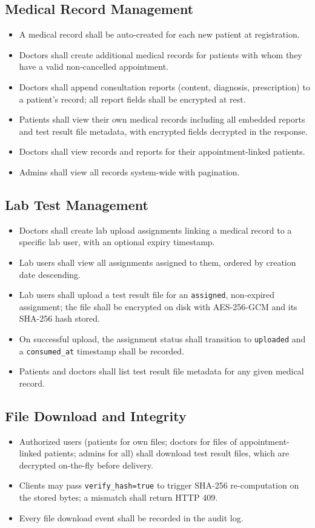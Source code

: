 \documentclass[a4paper,12pt]{report}
\begin{document}
\subsection{Medical Record Management}
\begin{itemize}
    \item A medical record shall be auto-created for each new patient at registration.
    \item Doctors shall create additional medical records for patients with whom they have a valid non-cancelled appointment.
    \item Doctors shall append consultation reports (content, diagnosis, prescription) to a patient's record; all report fields shall be encrypted at rest.
    \item Patients shall view their own medical records including all embedded reports and test result file metadata, with encrypted fields decrypted in the response.
    \item Doctors shall view records and reports for their appointment-linked patients.
    \item Admins shall view all records system-wide with pagination.
\end{itemize}

\subsection{Lab Test Management}
\begin{itemize}
    \item Doctors shall create lab upload assignments linking a medical record to a specific lab user, with an optional expiry timestamp.
    \item Lab users shall view all assignments assigned to them, ordered by creation date descending.
    \item Lab users shall upload a test result file for an \texttt{assigned}, non-expired assignment; the file shall be encrypted on disk with AES-256-GCM and its SHA-256 hash stored.
    \item On successful upload, the assignment status shall transition to \texttt{uploaded} and a \texttt{consumed\_at} timestamp shall be recorded.
    \item Patients and doctors shall list test result file metadata for any given medical record.
\end{itemize}

\subsection{File Download and Integrity}
\begin{itemize}
    \item Authorized users (patients for own files; doctors for files of appointment-linked patients; admins for all) shall download test result files, which are decrypted on-the-fly before delivery.
    \item Clients may pass \texttt{verify\_hash=true} to trigger SHA-256 re-computation on the stored bytes; a mismatch shall return HTTP 409.
    \item Every file download event shall be recorded in the audit log.
\end{itemize}
\end{document}
